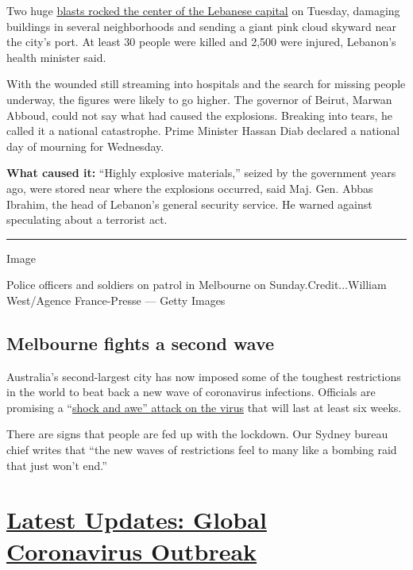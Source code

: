 Two huge
\href{https://www.nytimes.com/2020/08/04/world/middleeast/beirut-explosion-blast.html?action=click\&module=Top\%20Stories\&pgtype=Homepage}{blasts
rocked the center of the Lebanese capital} on Tuesday, damaging
buildings in several neighborhoods and sending a giant pink cloud
skyward near the city's port. At least 30 people were killed and 2,500
were injured, Lebanon's health minister said.

With the wounded still streaming into hospitals and the search for
missing people underway, the figures were likely to go higher. The
governor of Beirut, Marwan Abboud, could not say what had caused the
explosions. Breaking into tears, he called it a national catastrophe.
Prime Minister Hassan Diab declared a national day of mourning for
Wednesday.

\textbf{What caused it:} ``Highly explosive materials,'' seized by the
government years ago, were stored near where the explosions occurred,
said Maj. Gen. Abbas Ibrahim, the head of Lebanon's general security
service. He warned against speculating about a terrorist act.

\begin{center}\rule{0.5\linewidth}{\linethickness}\end{center}

Image

Police officers and soldiers on patrol in Melbourne on
Sunday.Credit...William West/Agence France-Presse --- Getty Images

\hypertarget{melbourne-fights-a-second-wave}{%
\subsection{Melbourne fights a second
wave}\label{melbourne-fights-a-second-wave}}

Australia's second-largest city has now imposed some of the toughest
restrictions in the world to beat back a new wave of coronavirus
infections. Officials are promising a
``\href{https://www.nytimes.com/2020/08/04/world/australia/coronavirus-melbourne-lockdown.html}{shock
and awe'' attack on the virus} that will last at least six weeks.

There are signs that people are fed up with the lockdown. Our Sydney
bureau chief writes that ``the new waves of restrictions feel to many
like a bombing raid that just won't end.''

\hypertarget{latest-updates-global-coronavirus-outbreak}{%
\section{\texorpdfstring{\href{https://www.nytimes.com/2020/08/04/world/coronavirus-cases.html?action=click\&pgtype=Article\&state=default\&region=MAIN_CONTENT_1\&context=storylines_live_updates}{Latest
Updates: Global Coronavirus
Outbreak}}{Latest Updates: Global Coronavirus Outbreak}}\label{latest-updates-global-coronavirus-outbreak}}

